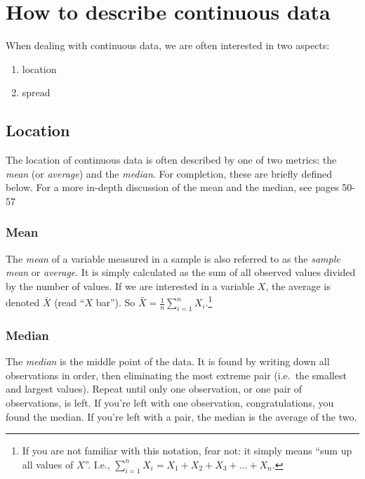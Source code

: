 \documentclass[]{book}
\providecommand{\tightlist}{%
  \setlength{\itemsep}{0pt}\setlength{\parskip}{0pt}}
\let\rmarkdownfootnote\footnote%
\def\footnote{\protect\rmarkdownfootnote}
\theoremstyle{definition}
\theoremstyle{definition}
\theoremstyle{definition}
\theoremstyle{remark}
\begin{document}
\hypertarget{how-to-describe-continuous-data}{%
\section{How to describe continuous data}\label{how-to-describe-continuous-data}}

When dealing with continuous data, we are often interested in two aspects:

\begin{enumerate}
\def\labelenumi{\arabic{enumi}.}
\tightlist
\item
  location
\item
  spread
\end{enumerate}

\hypertarget{location}{%
\subsection{Location}\label{location}}

The location of continuous data is often described by one of two metrics: the \emph{mean} (or \emph{average}) and the \emph{median}. For completion, these are briefly defined below. For a more in-depth discussion of the mean and the median, see \citep{ls} pages 50-57

\hypertarget{mean}{%
\subsubsection{Mean}\label{mean}}

The \emph{mean} of a variable measured in a sample is also referred to as the \emph{sample mean} or \emph{average}. It is simply calculated as the sum of all observed values divided by the number of values. If we are interested in a variable \(X\), the average is denoted \(\bar{X}\) (read ``\(X\) bar''). So \(\bar{X} = \frac{1}{n}\sum_{i=1}^n X_i\).\footnote{If you are not familiar with this notation, fear not: it simply means ``sum up all values of \(X\)''. I.e., \(\sum_{i=1}^n X_i = X_1 + X_2 + X_3 + ... + X_n\).}

\hypertarget{median}{%
\subsubsection{Median}\label{median}}

The \emph{median} is the middle point of the data. It is found by writing down all observations in order, then eliminating the most extreme pair (i.e.~the smallest and largest values). Repeat until only one observation, or one pair of observations, is left. If you're left with one observation, congratulations, you found the median. If you're left with a pair, the median is the average of the two.
\end{document}
